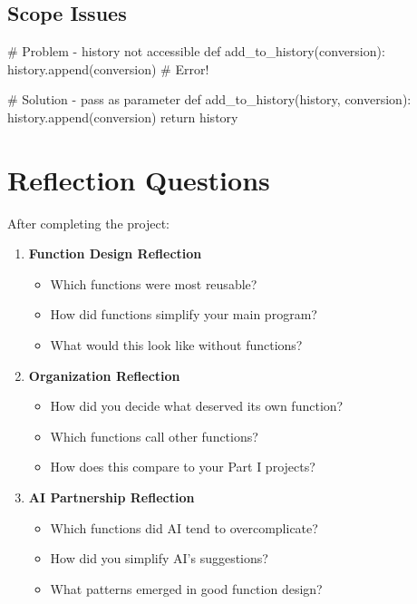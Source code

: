 \documentclass[
  letterpaper,
  DIV=11,
  numbers=noendperiod,
  oneside]{scrreprt}
\newenvironment{Shaded}{}{}
\newcommand{\CommentTok}[1]{\textcolor[rgb]{0.42,0.45,0.49}{#1}}
\newcommand{\ControlFlowTok}[1]{\textcolor[rgb]{0.84,0.23,0.29}{#1}}
\newcommand{\KeywordTok}[1]{\textcolor[rgb]{0.84,0.23,0.29}{#1}}
\newcommand{\NormalTok}[1]{\textcolor[rgb]{0.14,0.16,0.18}{#1}}
\providecommand{\tightlist}{%
  \setlength{\itemsep}{0pt}\setlength{\parskip}{0pt}}\usepackage{longtable,booktabs,array}
\begin{document}
\subsection{Scope Issues}\label{scope-issues}

\begin{Shaded}
\begin{Highlighting}[]
\CommentTok{\# Problem {-} history not accessible}
\KeywordTok{def}\NormalTok{ add\_to\_history(conversion):}
\NormalTok{    history.append(conversion)  }\CommentTok{\# Error!}

\CommentTok{\# Solution {-} pass as parameter}
\KeywordTok{def}\NormalTok{ add\_to\_history(history, conversion):}
\NormalTok{    history.append(conversion)}
    \ControlFlowTok{return}\NormalTok{ history}
\end{Highlighting}
\end{Shaded}

\section{Reflection Questions}\label{reflection-questions-4}

After completing the project:

\begin{enumerate}
\def\labelenumi{\arabic{enumi}.}
\tightlist
\item
  \textbf{Function Design Reflection}

  \begin{itemize}
  \tightlist
  \item
    Which functions were most reusable?
  \item
    How did functions simplify your main program?
  \item
    What would this look like without functions?
  \end{itemize}
\item
  \textbf{Organization Reflection}

  \begin{itemize}
  \tightlist
  \item
    How did you decide what deserved its own function?
  \item
    Which functions call other functions?
  \item
    How does this compare to your Part I projects?
  \end{itemize}
\item
  \textbf{AI Partnership Reflection}

  \begin{itemize}
  \tightlist
  \item
    Which functions did AI tend to overcomplicate?
  \item
    How did you simplify AI's suggestions?
  \item
    What patterns emerged in good function design?
  \end{itemize}
\end{enumerate}
\end{document}
